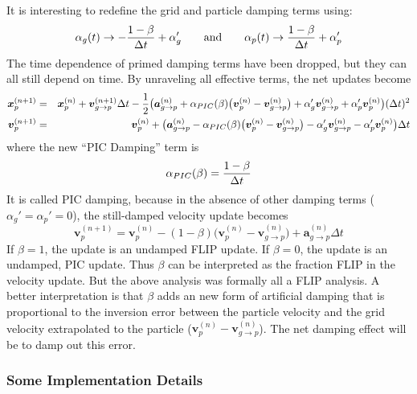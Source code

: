 \documentclass[11pt]{article}
\renewcommand{\vec}[1]{\boldsymbol{#1}}
\begin{document}
It is interesting to redefine the grid and particle damping terms using:
\begin{equation}
     \alpha_g(t) \to -{1-\beta\over\Delta t} + \alpha_g' \qquad{\rm and}\qquad \alpha_p(t) \to {1-\beta\over\Delta t} + \alpha_p'
     \label{PICDamping}
\end{equation}
The time dependence of primed damping terms have been dropped, but they can all still depend on time. 
By unraveling all effective terms, the net updates become
\begin{eqnarray}
   \vec{x}_{p}^{(n+1)} & = & \vec{x}_p^{(n)} +\vec v_{g\to p}^{(n+1)}\Delta t - {1 \over 2}\bigl(\vec{a}_{g\to p}^{(n)} 
       + \alpha_{PIC}(\beta)\bigl(\vec v_p^{(n)}-\vec v_{g\to p}^{(n)}\bigr) +   \alpha_g'\vec v_{g\to p}^{(n)}+  \alpha_p'\vec v_p^{(n)} \bigr)(\Delta t)^2  \\
   \vec{v}_{p}^{(n+1)} & = & \vec{v}_p^{(n)} + \bigl(\vec{a}_{g\to p}^{(n)} - \alpha_{PIC}(\beta)\bigl(\vec v_p^{(n)}-\vec v_{g\to p}^{(n)}\bigr)
         -  \alpha_g'\vec{v}_{g\to p}^{(n)} -  \alpha_p'\vec{v}_p^{(n)} \bigr)\Delta t 
\end{eqnarray}
where the new ``PIC Damping'' term is
\begin{equation}
       \alpha_{PIC}(\beta) = {1-\beta\over \Delta t}
\end{equation}
It is called PIC damping, because in the absence of other damping terms ($\alpha_g'=\alpha_p'=0$), the still-damped velocity update becomes
\begin{equation}
   \vec{v}_{p}^{(n+1)} = \vec{v}_p^{(n)}  - (1-\beta)\bigl(\vec v_p^{(n)}-\vec v_{g\to p}^{(n)}\bigr)
         + \vec{a}_{g\to p}^{(n)}\Delta t 
\end{equation}
If $\beta=1$, the update is an undamped FLIP update. If $\beta=0$, the update is an undamped, PIC update. Thus $\beta$ can be interpreted as the fraction FLIP in the velocity update. But the above analysis was formally all a FLIP analysis. A better interpretation is that $\beta$ adds an new form of artificial damping that is proportional to the inversion error between the particle velocity and the grid velocity extrapolated to the particle ($\vec v_p^{(n)}-\vec v_{g\to p}^{(n)}$). The net damping effect will be to damp out this error.

\subsubsection{Some Implementation Details}
\end{document}
